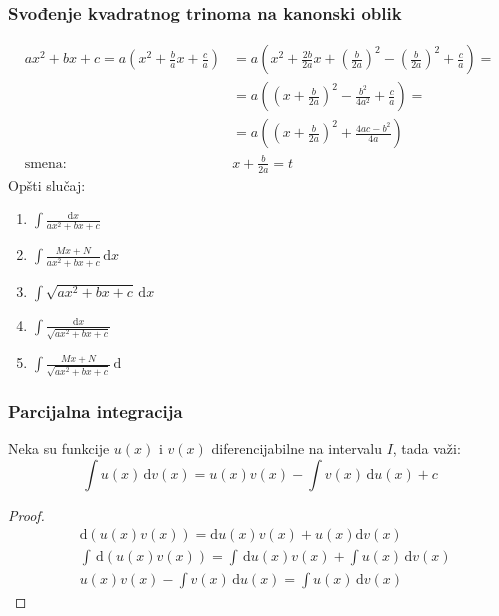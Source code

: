 \subsubsection{Svođenje kvadratnog trinoma na kanonski oblik}
	\begin{align*}
		ax^2+bx+c = a\left(x^2+\frac{b}{a}x+\frac{c}{a}\right) &= a\left(x^2 + \frac{2b}{2a}x + \left(\frac{b}{2a}\right)^2 - \left(\frac{b}{2a}\right)^2 + \frac{c}{a}\right) =\\
		&= a\left(\left(x+\frac{b}{2a}\right)^2-\frac{b^2}{4a^2}+\frac{c}{a}\right) =\\
		&= a\left(\left(x+\frac{b}{2a}\right)^2 + \frac{4ac-b^2}{4a}\right)\\
		\text{smena: } &x+\frac{b}{2a} = t
	\end{align*}
	Opšti slučaj:
	\begin{enumerate}[label = \arabic*)]
		\item $\int \frac{\mathrm{d}x}{ax^2+bx+c}$
		\item $\int \frac{Mx+N}{ax^2+bx+c}\, \mathrm{d}x$
		\item $\int \sqrt{ax^2+bx+c}\, \mathrm{d}x$
		\item $\int \frac{\mathrm{d}x}{\sqrt{ax^2+bx+c}}$
		\item $\int \frac{Mx+N}{\sqrt{ax^2+bx+c}}\, \mathrm{d}$
	\end{enumerate}
	
	
	
\subsubsection{Parcijalna integracija}
		\begin{theorem}
			Neka su funkcije $u(x)$ i $v(x)$ diferencijabilne na intervalu $I$, tada važi:
			$$\int u(x)\, \mathrm{d}v(x) = u(x)v(x)-\int v(x)\, \mathrm{d}u(x) + c$$
		\end{theorem}
		\begin{proof}
			\begin{align*}
				&\mathrm{d}(u(x)v(x))=\mathrm{d}u(x)v(x)+u(x)\mathrm{d}v(x) \\
				&\int \, \mathrm{d}(u(x)v(x)) = \int \, \mathrm{d}u(x)v(x)+ \int u(x)\, \mathrm{d}v(x)\\
				&u(x)v(x) - \int v(x)\, \mathrm{d}u(x) = \int u(x)\, \mathrm{d}v(x)
			\end{align*}
		\end{proof}
		

